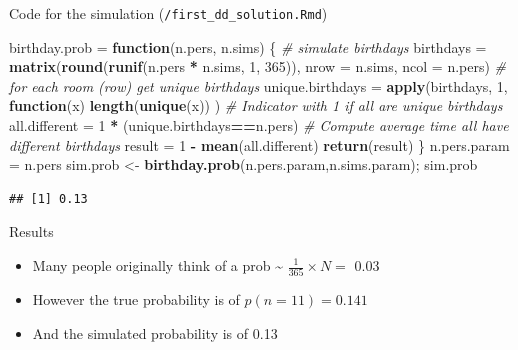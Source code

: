 \documentclass[ignorenonframetext,]{beamer}
\newenvironment{Shaded}{\begin{snugshade}}{\end{snugshade}}
\newcommand{\CommentTok}[1]{\textcolor[rgb]{0.56,0.35,0.01}{\textit{#1}}}
\newcommand{\ControlFlowTok}[1]{\textcolor[rgb]{0.13,0.29,0.53}{\textbf{#1}}}
\newcommand{\DataTypeTok}[1]{\textcolor[rgb]{0.13,0.29,0.53}{#1}}
\newcommand{\DecValTok}[1]{\textcolor[rgb]{0.00,0.00,0.81}{#1}}
\newcommand{\KeywordTok}[1]{\textcolor[rgb]{0.13,0.29,0.53}{\textbf{#1}}}
\newcommand{\NormalTok}[1]{#1}
\newcommand{\OperatorTok}[1]{\textcolor[rgb]{0.81,0.36,0.00}{\textbf{#1}}}
\newcommand{\StringTok}[1]{\textcolor[rgb]{0.31,0.60,0.02}{#1}}
\providecommand{\tightlist}{%
  \setlength{\itemsep}{0pt}\setlength{\parskip}{0pt}}
\begin{document}
\begin{frame}[fragile]{Code for the simulation
(\texttt{/first\_dd\_solution.Rmd})}
\protect\hypertarget{code-for-the-simulation-first_dd_solution.rmd}{}

\begin{Shaded}
\begin{Highlighting}[]
\NormalTok{birthday.prob =}\StringTok{ }\ControlFlowTok{function}\NormalTok{(n.pers, n.sims) \{}
  \CommentTok{# simulate birthdays}
\NormalTok{  birthdays =}\StringTok{ }\KeywordTok{matrix}\NormalTok{(}\KeywordTok{round}\NormalTok{(}\KeywordTok{runif}\NormalTok{(n.pers }\OperatorTok{*}\StringTok{ }\NormalTok{n.sims, }
                                 \DecValTok{1}\NormalTok{, }\DecValTok{365}\NormalTok{)), }
                      \DataTypeTok{nrow =}\NormalTok{ n.sims, }\DataTypeTok{ncol =}\NormalTok{ n.pers)}
  \CommentTok{# for each room (row) get unique birthdays}
\NormalTok{  unique.birthdays =}\StringTok{ }\KeywordTok{apply}\NormalTok{(birthdays, }\DecValTok{1}\NormalTok{, }
                           \ControlFlowTok{function}\NormalTok{(x) }\KeywordTok{length}\NormalTok{(}\KeywordTok{unique}\NormalTok{(x)) )}
  \CommentTok{# Indicator with 1 if all are unique birthdays}
\NormalTok{  all.different =}\StringTok{ }\DecValTok{1} \OperatorTok{*}\StringTok{ }\NormalTok{(unique.birthdays}\OperatorTok{==}\NormalTok{n.pers)}
  \CommentTok{# Compute average time all have different birthdays }
\NormalTok{  result =}\StringTok{ }\DecValTok{1} \OperatorTok{-}\StringTok{ }\KeywordTok{mean}\NormalTok{(all.different)}
\KeywordTok{return}\NormalTok{(result)}
\NormalTok{\}}
\NormalTok{n.pers.param =}\StringTok{ }\NormalTok{n.pers }
\NormalTok{sim.prob <-}\StringTok{ }\KeywordTok{birthday.prob}\NormalTok{(n.pers.param,n.sims.param); sim.prob}
\end{Highlighting}
\end{Shaded}

\begin{verbatim}
## [1] 0.13
\end{verbatim}

\end{frame}

\begin{frame}{Results}
\protect\hypertarget{results}{}

\begin{itemize}
\tightlist
\item
  Many people originally think of a prob \textasciitilde{}
  \(\frac{1}{365} \times N =\) 0.03
\item
  However the true probability is of \(p(n= 11) = 0.141\)
\item
  And the simulated probability is of 0.13
\end{itemize}

\end{frame}
\end{document}
